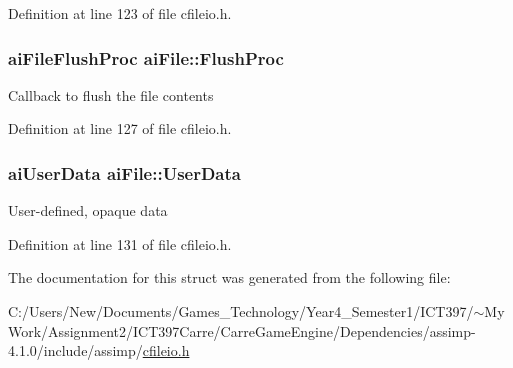 Definition at line 123 of file cfileio.h.\hypertarget{structai_file_1102d28d1c0be68ffed20476669bdb0d}{
\subsubsection[FlushProc]{\setlength{\rightskip}{0pt plus 5cm}aiFileFlushProc {\bf aiFile::FlushProc}}}
\label{structai_file_1102d28d1c0be68ffed20476669bdb0d}


Callback to flush the file contents 

Definition at line 127 of file cfileio.h.\hypertarget{structai_file_ec528fa18f4755fe4f28d604fde28aad}{
\subsubsection[UserData]{\setlength{\rightskip}{0pt plus 5cm}aiUserData {\bf aiFile::UserData}}}
\label{structai_file_ec528fa18f4755fe4f28d604fde28aad}


User-defined, opaque data 

Definition at line 131 of file cfileio.h.

The documentation for this struct was generated from the following file:\begin{CompactItemize}
\item 
C:/Users/New/Documents/Games\_\-Technology/Year4\_\-Semester1/ICT397/$\sim$My Work/Assignment2/ICT397Carre/CarreGameEngine/Dependencies/assimp-4.1.0/include/assimp/\hyperlink{cfileio_8h}{cfileio.h}\end{CompactItemize}
